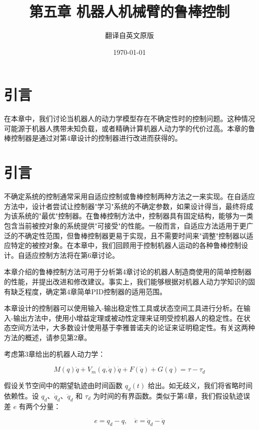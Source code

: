 \documentclass[UTF8,12pt,a4paper]{ctexart}
\title{第五章 机器人机械臂的鲁棒控制}
\author{翻译自英文原版}
\date{\today}
\begin{document}
  \maketitle
\fi

\section*{引言}

在本章中，我们讨论当机器人的动力学模型存在不确定性时的控制问题。这种情况可能源于机器人携带未知负载，或者精确计算机器人动力学的代价过高。本章的鲁棒控制器是通过对第4章设计的控制器进行改进而获得的。

\section{引言}

不确定系统的控制通常采用自适应控制或鲁棒控制两种方法之一来实现。在自适应方法中，设计者尝试让控制器"学习"系统的不确定参数，如果设计得当，最终将成为该系统的"最优"控制器。在鲁棒控制方法中，控制器具有固定结构，能够为一类包含当前被控对象的系统提供"可接受"的性能。一般而言，自适应方法适用于更广泛的不确定性范围，但鲁棒控制器更易于实现，且不需要时间来"调整"控制器以适应特定的被控对象。在本章中，我们回顾用于控制机器人运动的各种鲁棒控制设计。自适应控制方法将在第6章讨论。

本章介绍的鲁棒控制方法可用于分析第4章讨论的机器人制造商使用的简单控制器的性能，并提出改进和修改建议。事实上，我们能够根据对机器人动力学知识的固有缺乏程度，确定第4章简单PID控制器的适用范围。

本章设计的控制器可以使用输入-输出稳定性工具或状态空间工具进行分析。在输入-输出方法中，使用小增益定理或被动性定理来证明受控机器人的稳定性。在状态空间方法中，大多数设计使用基于李雅普诺夫的论证来证明稳定性。有关这两种方法的概述，请参见第2章。

考虑第3章给出的机器人动力学：

\begin{equation}\label{eq:5.1.1}
M(q)\ddot{q} + V_m(q, \dot{q})\dot{q} + F(\dot{q}) + G(q) = \tau - \tau_d
\end{equation}

假设关节空间中的期望轨迹由时间函数 $q_d(t)$ 给出。如无歧义，我们将省略时间依赖性。设 $q_d$、$\dot{q}_d$、$\ddot{q}_d$ 和 $\tau_d$ 为时间的有界函数。类似于第4章，我们假设轨迹误差 $e$ 有两个分量：

\begin{equation}\label{eq:5.1.2}
e = q_d - q, \quad \dot{e} = \dot{q}_d - \dot{q}
\end{equation}
\end{document}
